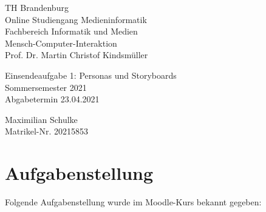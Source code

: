 \documentclass{article}
\begin{document}
\begin{titlepage}
	\begin{flushleft}
		TH Brandenburg \\
		Online Studiengang Medieninformatik \\
		Fachbereich Informatik und Medien \\
		Mensch-Computer-Interaktion \\
		Prof. Dr. Martin Christof Kindsmüller
	\end{flushleft}

	\vfill

	\begin{center}
		\Large{Einsendeaufgabe 1: Personas und Storyboards}\\[0.5em]
		\large{Sommersemester 2021}\\[0.25em]
		\large{Abgabetermin 23.04.2021}
	\end{center}

	\vfill

	\begin{flushright}
		Maximilian Schulke \\
		Matrikel-Nr. 20215853
	\end{flushright}
\end{titlepage}

\tableofcontents

\vfill

\section{Aufgabenstellung}

Folgende Aufgabenstellung wurde im Moodle-Kurs bekannt gegeben:
\end{document}
